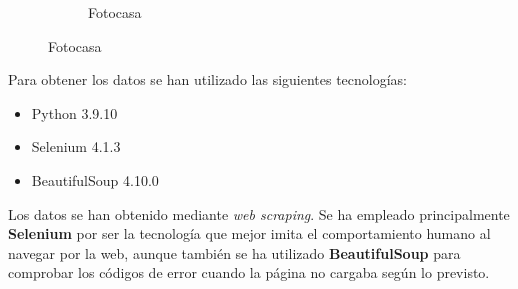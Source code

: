 \documentclass[12pt]{article}
\begin{document}
\begin{figure}[h]
\begin{subfigure}{0.5\textwidth}
		\caption{\vspace{1.5em}Fotocasa}
	\end{subfigure}
	\vspace{-2.5em}
\end{figure}

Para obtener los datos se han utilizado las siguientes tecnologías:

\begin{multicols}{3}
	\begin{itemize}[topsep=0cm,partopsep=0cm,wide]
		\item Python 3.9.10
		\item Selenium 4.1.3
		\item BeautifulSoup 4.10.0
	\end{itemize}
\end{multicols}\vspace{-10pt}

Los datos se han obtenido mediante \textit{web scraping}. Se ha empleado principalmente \textbf{Selenium} por ser la tecnología que mejor imita el comportamiento humano al navegar por la web, aunque también se ha utilizado \textbf{BeautifulSoup} para comprobar los códigos de error cuando la página no cargaba según lo previsto.
\end{document}
